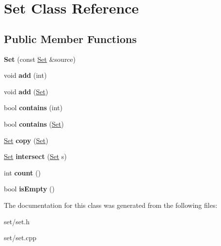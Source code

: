 \hypertarget{classSet}{\section{Set Class Reference}
\label{classSet}
}
\subsection*{Public Member Functions}
\begin{DoxyCompactItemize}
\item 
\hypertarget{classSet_ade278ae4c854ce7d0f1f30cf8a7261c0}{{\bfseries Set} (const \hyperlink{classSet}{Set} \&source)}\label{classSet_ade278ae4c854ce7d0f1f30cf8a7261c0}

\item 
\hypertarget{classSet_a82601c80c4b9339e72260a812e956241}{void {\bfseries add} (int)}\label{classSet_a82601c80c4b9339e72260a812e956241}

\item 
\hypertarget{classSet_ac5ac16d671114a84654a68b14fea6d19}{void {\bfseries add} (\hyperlink{classSet}{Set})}\label{classSet_ac5ac16d671114a84654a68b14fea6d19}

\item 
\hypertarget{classSet_a08d9b0d8235e946c6afd5234aa536fb3}{bool {\bfseries contains} (int)}\label{classSet_a08d9b0d8235e946c6afd5234aa536fb3}

\item 
\hypertarget{classSet_affd89ff0f9ea60f4b3f15ed2b9b53f26}{bool {\bfseries contains} (\hyperlink{classSet}{Set})}\label{classSet_affd89ff0f9ea60f4b3f15ed2b9b53f26}

\item 
\hypertarget{classSet_acb80e4086c16baa5a0ab5d1e7fb8c2d7}{\hyperlink{classSet}{Set} {\bfseries copy} (\hyperlink{classSet}{Set})}\label{classSet_acb80e4086c16baa5a0ab5d1e7fb8c2d7}

\item 
\hypertarget{classSet_a33e855c52d34503a59b153827d0df774}{\hyperlink{classSet}{Set} {\bfseries intersect} (\hyperlink{classSet}{Set} s)}\label{classSet_a33e855c52d34503a59b153827d0df774}

\item 
\hypertarget{classSet_a4b34de1f00e7a96b7199ef0018324956}{int {\bfseries count} ()}\label{classSet_a4b34de1f00e7a96b7199ef0018324956}

\item 
\hypertarget{classSet_a46ae39a6de21c896881a25a26289c599}{bool {\bfseries is\-Empty} ()}\label{classSet_a46ae39a6de21c896881a25a26289c599}

\end{DoxyCompactItemize}


The documentation for this class was generated from the following files\-:\begin{DoxyCompactItemize}
\item 
set/set.\-h\item 
set/set.\-cpp\end{DoxyCompactItemize}
